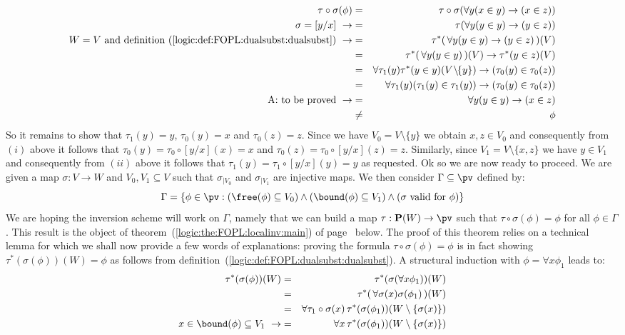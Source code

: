    \begin{eqnarray*}
    \tau\circ\sigma(\phi)&=&\tau\circ\sigma(\forall y(x\in y)\to(x\in
    z))\\
    \sigma=[y/x]\ \rightarrow&=&\tau(\forall y(y\in y)\to(y\in z))\\
    \mbox{$W=V$ and definition~(\ref{logic:def:FOPL:dualsubst:dualsubst})}\
    \rightarrow
    &=&\tau^{*}(\,\forall y(y\in y)\to(y\in z)\,)(V)\\
    &=&\tau^{*}(\,\forall y(y\in y)\,)(V)\to\tau^{*}(y\in z)(V)\\
    &=&\forall \tau_{1}(y)\tau^{*}(y\in
    y)(V\!\setminus\!\!\{y\})\to(\tau_{0}(y)\in\tau_{0}(z))\\
    &=&\forall\tau_{1}(y)(\tau_{1}(y)\in
    \tau_{1}(y))\to(\tau_{0}(y)\in\tau_{0}(z))\\
    \mbox{A: to be proved}\ \rightarrow&=&\forall y(y\in y)\to(x\in z)\\
    &\neq&\phi
    \end{eqnarray*}
So it remains to show that $\tau_{1}(y)=y$, $\tau_{0}(y)=x$ and
$\tau_{0}(z)=z$. Since we have $V_{0}=V\setminus\{y\}$ we obtain
$x,z\in V_{0}$ and consequently from $(i)$ above it follows that
$\tau_{0}(y)=\tau_{0}\circ[y/x](x)=x$ and
$\tau_{0}(z)=\tau_{0}\circ[y/x](z)=z$. Similarly, since
$V_{1}=V\setminus\{x,z\}$ we have $y\in V_{1}$ and consequently from
$(ii)$ above it follows that $\tau_{1}(y)=\tau_{1}\circ[y/x](y)=y$
as requested. Ok so we are now ready to proceed. We are given a map
$\sigma:V\to W$ and $V_{0}, V_{1}\subseteq V$ such that
$\sigma_{|V_{0}}$ and $\sigma_{|V_{1}}$ are injective maps. We then
consider $\Gamma\subseteq\pv$ defined by:
    \[
    \Gamma=\{\phi\in\pv:(\free(\phi)\subseteq
    V_{0})\land(\bound(\phi)\subseteq V_{1})\land(\mbox{$\sigma$
    valid for $\phi$})\}
    \]
We are hoping the inversion scheme will work on $\Gamma$, namely
that we can build a map $\tau:{\bf P}(W)\to\pv$ such that
$\tau\circ\sigma(\phi)=\phi$ for all $\phi\in\Gamma$. This result is
the object of theorem~(\ref{logic:the:FOPL:localinv:main}) of
page~\pageref{logic:the:FOPL:localinv:main} below. The proof of this
theorem relies on a technical lemma for which we shall now provide a
few words of explanations: proving the formula
$\tau\circ\sigma(\phi)=\phi$ is in fact showing
$\tau^{*}(\sigma(\phi))(W)=\phi$ as follows from
definition~(\ref{logic:def:FOPL:dualsubst:dualsubst}). A structural
induction with $\phi=\forall x\phi_{1}$ leads to:
    \begin{eqnarray*}
    \tau^{*}(\sigma(\phi))(W)&=&\tau^{*}(\sigma(\forall
    x\phi_{1}))(W)\\
    &=&\tau^{*}(\,\forall
    \sigma(x)\sigma(\phi_{1})\,)(W)\\
    &=&\forall
    \tau_{1}\circ\sigma(x)\,\tau^{*}(\sigma(\phi_{1}))(W\setminus\{\sigma(x)\})\\
    x\in\bound(\phi)\subseteq V_{1}\ \rightarrow
    &=&\forall x\,\tau^{*}(\sigma(\phi_{1}))(W\setminus\{\sigma(x)\})
    \end{eqnarray*}
